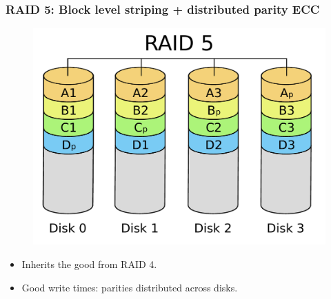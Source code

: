 \documentclass{beamer}
\begin{document}
\begin{frame}
    \frametitle{RAID 5: Block level striping + distributed parity ECC}
    \begin{figure}
    \includegraphics[height=0.3\paperwidth]{RAID5.pdf}
    \end{figure}
    \begin{itemize}
        \item Inherits the good from RAID 4. \pause
        \item Good write times: parities distributed across disks.
    \end{itemize}
\end{frame}
\end{document}

